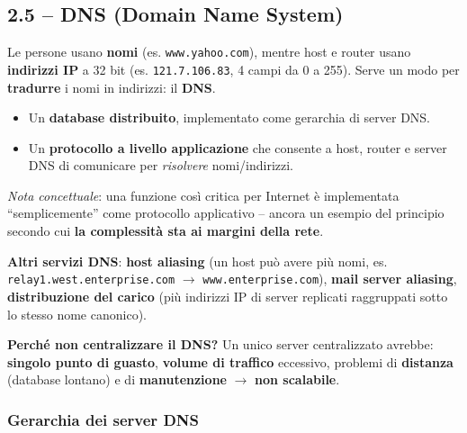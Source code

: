 \documentclass[12pt, a4paper]{article}
\begin{document}
\subsection{2.5 -- DNS (Domain Name System)}

Le persone usano \textbf{nomi} (es. \texttt{www.yahoo.com}), mentre host e router usano \textbf{indirizzi IP} a 32 bit (es. \texttt{121.7.106.83}, 4 campi da 0 a 255). Serve un modo per \textbf{tradurre} i nomi in indirizzi: il \textbf{DNS}.

\begin{tcolorbox}[colback=lightergray!10, colframe=tocsec, title=\textbf{Cos'è il DNS}]
\begin{itemize}
    \item Un \textbf{database distribuito}, implementato come gerarchia di server DNS.
    \item Un \textbf{protocollo a livello applicazione} che consente a host, router e server DNS di comunicare per \textit{risolvere} nomi/indirizzi.
\end{itemize}
\textit{Nota concettuale}: una funzione così critica per Internet è implementata ``semplicemente'' come protocollo applicativo -- ancora un esempio del principio secondo cui \textbf{la complessità sta ai margini della rete}.
\end{tcolorbox}

\textbf{Altri servizi DNS}: \textbf{host aliasing} (un host può avere più nomi, es. \texttt{relay1.west.enterprise.com} $\to$ \texttt{www.enterprise.com}), \textbf{mail server aliasing}, \textbf{distribuzione del carico} (più indirizzi IP di server replicati raggruppati sotto lo stesso nome canonico).

\textbf{Perché non centralizzare il DNS?} Un unico server centralizzato avrebbe: \textbf{singolo punto di guasto}, \textbf{volume di traffico} eccessivo, problemi di \textbf{distanza} (database lontano) e di \textbf{manutenzione} $\to$ \textbf{non scalabile}.

\subsubsection{Gerarchia dei server DNS}
\end{document}
